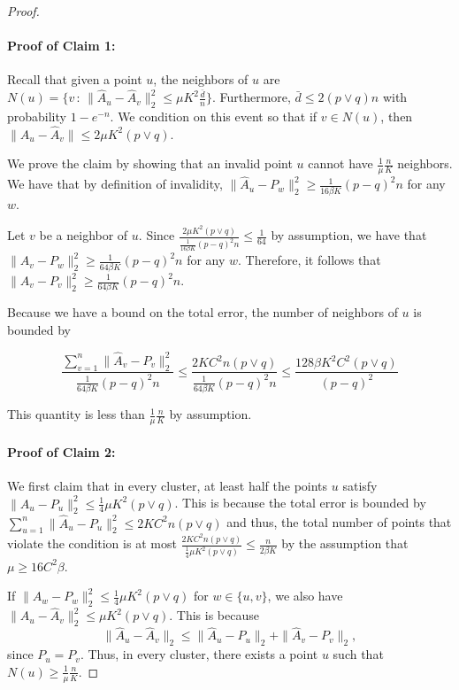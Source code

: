 \begin{proof}
\paragraph{\textbf{Proof of Claim 1:}} Recall that given a point $u$, the neighbors of $u$ are $N(u) = \{ v \,:\, \| \hat{A}_u - \hat{A}_v \|_2^2 \leq \mu K^2 \frac{\bar{d}}{n} \}$. Furthermore, $\bar{d} \leq 2 (p \vee q) n$ with probability $1 - e^{-n}$. 
We condition on this event so that if $v \in N(u)$, then $\| \hat{A}_u - \hat{A}_v \| \leq 2 \mu K^2 (p \vee q)$. 

We prove the claim by showing that an invalid point $u$ cannot have $\frac{1}{\mu} \frac{n}{K}$ neighbors. We have that by definition of invalidity, $ \| \hat{A}_u - P_w \|_2^2 \geq \frac{1}{16 \beta K} (p-q)^2 n$ for any $w$.

Let $v$ be a neighbor of $u$. Since $ \frac{2 \mu K^2 (p \vee q)}{ \frac{1}{16 \beta K} (p-q)^2 n} \leq \frac{1}{64}$ by assumption, we have that $\| \hat{A}_v - P_w \|_2^2 \geq \frac{1}{64 \beta K} (p - q)^2 n$ for any $w$. Therefore, it follows that $\| \hat{A}_v - P_v \|_2^2 \geq \frac{1}{64 \beta K} (p-q)^2 n$. 

Because we have a bound on the total error, the number of neighbors of $u$ is bounded by 

\[
\frac{\sum_{v=1}^n \| \hat{A}_v - P_v \|_2^2}{ \frac{1}{64 \beta K} (p-q)^2 n } \leq 
        \frac{ 2 K C^2 n (p \vee q)}{ \frac{1}{64 \beta K} (p-q)^2 n} \leq \frac{128 \beta K^2 C^2 (p \vee q)}{(p-q)^2} 
\]

This quantity is less than $\frac{1}{\mu} \frac{n}{K}$ by assumption.

\paragraph{\textbf{Proof of Claim 2:}} We first claim that in every cluster, at least half the points $u$ satisfy $\| \hat{A}_u - P_u \|_2^2 \leq \frac{1}{4} \mu K^2 (p \vee q)$. This is because the total error is bounded by $\sum_{u=1}^n \| \hat{A}_u - P_u \|_2^2 \leq 2 K C^2 n (p \vee q)$ and thus, the total number of points that violate the condition is at most $\frac{ 2 K C^2 n (p \vee q)}{ \frac{1}{4} \mu K^2 (p \vee q)} \leq \frac{n}{2 \beta K}$ by the assumption that $\mu \geq 16 C^2 \beta$. 

If $\| \hat{A}_w - P_w \|_2^2 \leq  \frac{1}{4} \mu K^2 (p \vee q)$ for $w \in \{u,v\}$, we also have $\| \hat{A}_u - \hat{A}_v \|_2^2 \leq \mu K^2 (p \vee q)$.  This is because
\begin{equation*}
\|\hat{A}_u - \hat{A}_v\|_2 \le \|\hat{A}_u - P_u\|_2 + \|\hat{A}_v - P_v\|_2,
\end{equation*}
since $P_u = P_v$. Thus, in every cluster, there exists a point $u$ such that $N(u) \geq \frac{1}{\mu} \frac{n}{K}$.



\end{proof}
